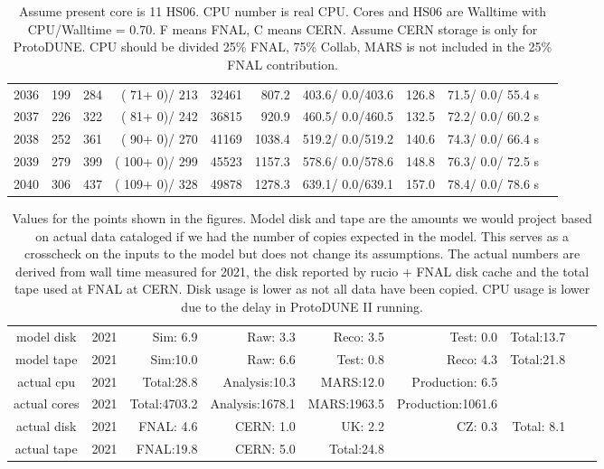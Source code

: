 \documentclass[12pt]{article}
\begin{document}
\begin{table}
\begin{tabular}[h]{crrrrrcccc}
2036&	 199&	 284&	(  71+   0)/ 213&	 32461&	    807.2&	 403.6/  0.0/403.6&	    126.8&	  71.5/  0.0/ 55.4 s\\
2037&	 226&	 322&	(  81+   0)/ 242&	 36815&	    920.9&	 460.5/  0.0/460.5&	    132.5&	  72.2/  0.0/ 60.2 s\\
2038&	 252&	 361&	(  90+   0)/ 270&	 41169&	   1038.4&	 519.2/  0.0/519.2&	    140.6&	  74.3/  0.0/ 66.4 s\\
2039&	 279&	 399&	( 100+   0)/ 299&	 45523&	   1157.3&	 578.6/  0.0/578.6&	    148.8&	  76.3/  0.0/ 72.5 s\\
2040&	 306&	 437&	( 109+   0)/ 328&	 49878&	   1278.3&	 639.1/  0.0/639.1&	    157.0&	  78.4/  0.0/ 78.6 s\\
\end{tabular}
\caption{Assume present core is   11 HS06. CPU number is real CPU. Cores and HS06 are Walltime with CPU/Walltime =  0.70.  F means FNAL, C means CERN. Assume CERN storage is only  for ProtoDUNE. CPU should be divided 25\% FNAL, 75\% Collab, MARS is not included in the 25\% FNAL contribution.}\normalsize
 \end{table}
\begin{table}
\footnotesize
 \centering \begin{tabular}[h]{crrrrrrrr}
          model disk&2021&Sim: 6.9&Raw: 3.3&Reco: 3.5&Test: 0.0&Total:13.7\\
          model tape&2021&Sim:10.0&Raw: 6.6&Test: 0.8&Reco: 4.3&Total:21.8\\
          actual cpu&2021&Total:28.8&Analysis:10.3&MARS:12.0&Production: 6.5\\
        actual cores&2021&Total:4703.2&Analysis:1678.1&MARS:1963.5&Production:1061.6\\
         actual disk&2021&FNAL: 4.6&CERN: 1.0&UK: 2.2&CZ: 0.3&Total: 8.1\\
         actual tape&2021&FNAL:19.8&CERN: 5.0&Total:24.8\\
\end{tabular}
\caption{Values for the points shown in the figures. Model disk and tape are the amounts we would project based on actual data cataloged if we had the number of copies expected in the model. This serves as a crosscheck on the inputs to the model but does not change its assumptions.  The actual numbers are derived from wall time measured for 2021, the disk reported by rucio + FNAL disk cache and the total tape used at FNAL at CERN. Disk usage is lower as not all data have been copied. CPU usage is lower due to the delay in ProtoDUNE II running.}\normalsize
 \end{table}
\end{document}
